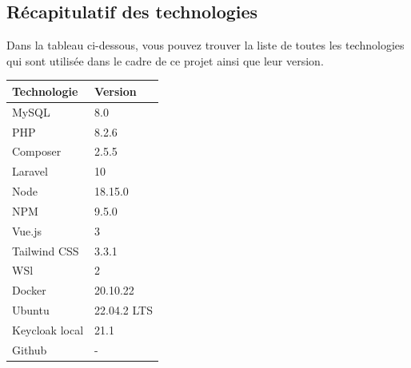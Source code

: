 \subsection{Récapitulatif des technologies}
Dans la tableau ci-dessous, vous pouvez trouver la liste de toutes les technologies qui sont utilisée dans le cadre de ce projet ainsi que leur version.
\begin{center}
    \begin{tabular}{|l|l|}
        \hline
        \textbf{Technologie} & \textbf{Version} \\
        \hline
        MySQL                & 8.0              \\
        \hline
        PHP                  & 8.2.6            \\
        \hline
        Composer             & 2.5.5            \\
        \hline
        Laravel              & 10               \\
        \hline
        Node                 & 18.15.0          \\
        \hline
        NPM                  & 9.5.0            \\
        \hline
        Vue.js               & 3                \\
        \hline
        Tailwind CSS         & 3.3.1            \\
        \hline
        WSl                  & 2                \\
        \hline
        Docker               & 20.10.22         \\
        \hline
        Ubuntu               & 22.04.2 LTS      \\
        \hline
        Keycloak local       & 21.1             \\
        \hline
        Github               & -                \\
        \hline
    \end{tabular}
\end{center}
